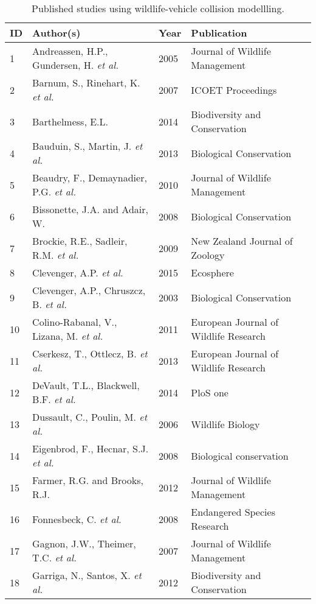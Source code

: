 \begin{longtable}[c]{p{.75cm}p{6cm}p{1.25cm}p{5.5cm}}
\caption[Published studies using wildlife-vehicle collision modellling.]{Published studies using wildlife-vehicle collision modellling.}
\label{coll_studies}\\
\toprule
ID & Author(s) & Year & Publication \\ 
  \hline
  \endhead
    1 & Andreassen, H.P., Gundersen, H. \textit{et al.} & 2005 & Journal of Wildlife Management \\ 
    2 & Barnum, S., Rinehart, K. \textit{et al.} & 2007 & ICOET Proceedings \\ 
    3 & Barthelmess, E.L. & 2014 & Biodiversity and Conservation \\ 
    4 & Bauduin, S., Martin, J. \textit{et al.} & 2013 & Biological Conservation  \\ 
    5 & Beaudry, F., Demaynadier, P.G. \textit{et al.} & 2010 & Journal of Wildlife Management \\ 
    6 & Bissonette, J.A. and Adair, W. & 2008 & Biological Conservation \\ 
    7 & Brockie, R.E., Sadleir, R.M. \textit{et al.} & 2009 & New Zealand Journal of Zoology \\ 
    8 & Clevenger, A.P. \textit{et al.} & 2015 & Ecosphere \\ 
    9 & Clevenger, A.P., Chruszcz, B. \textit{et al.} & 2003 & Biological Conservation  \\ 
   10 & Colino-Rabanal, V., Lizana, M. \textit{et al.} & 2011 & European Journal of Wildlife Research \\ 
   11 & Cserkesz, T., Ottlecz, B. \textit{et al.} & 2013 & European Journal of Wildlife Research \\ 
   12 & DeVault, T.L., Blackwell, B.F. \textit{et al.} & 2014 & PloS one \\ 
   13 & Dussault, C., Poulin, M. \textit{et al.} & 2006 & Wildlife Biology \\ 
   14 & Eigenbrod, F., Hecnar, S.J. \textit{et al.} & 2008 & Biological conservation \\ 
   15 & Farmer, R.G. and Brooks, R.J. & 2012 & Journal of Wildlife Management \\ 
   16 & Fonnesbeck, C. \textit{et al.} & 2008 & Endangered Species Research \\ 
   17 & Gagnon, J.W., Theimer, T.C. \textit{et al.} & 2007 & Journal of Wildlife Management \\ 
   18 & Garriga, N., Santos, X. \textit{et al.} & 2012 & Biodiversity and Conservation \\ 

\end{longtable}
